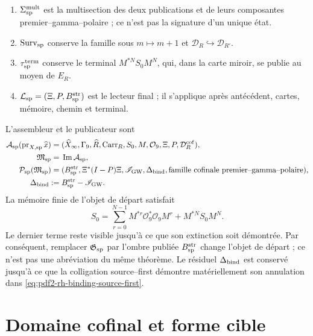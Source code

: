 \begin{enumerate}
 régulateur pour tous les canaux.
 \item \(\Sigma_{\rm sp}^{\rm mult}\) est la multisection des deux
 publications et de leurs composantes premier--gamma--polaire ; ce n'est pas la signature d'un
 unique état.
 \item \(\operatorname{Surv}_{\rm sp}\) conserve la famille sous
 \(m\mapsto m+1\) et \(\mathcal D_R\hookrightarrow\mathcal D_{R'}\).
 \item \(\tau_{\rm sp}^{\rm term}\) conserve le terminal
 \(M^{*N}S_0M^N\), qui, dans la carte miroir, se publie au moyen de \(E_R\).
    \item \(\mathcal L_{\rm sp}=(\Xi,P,B_{\rm sp}^{\rm str})\) est le lecteur final ; il s'applique
 après antécédent, cartes, mémoire, chemin et terminal.
\end{enumerate}

L'assembleur et le publicateur sont
\begin{equation}\label{eq:pdf2-rh-ensamblador-sp}
\begin{aligned}
 \mathcal A_{\rm sp}(\operatorname{pr}_{X,{\rm sp}}\widehat x)
  ={}&(\widehat X_\infty,\Gamma_9,\widehat R,
      \operatorname{Carr}_R,S_0,M,\mathcal O_9,
      \Xi,P,\mathcal D_R^{\rm cof}),\\
 \mathfrak M_{\rm sp}={}&\operatorname{Im}\mathcal A_{\rm sp},\\
 \mathcal P_{\rm sp}(\mathfrak M_{\rm sp})
  ={}&(B_{\rm sp}^{\rm str},\Xi^*(I-P)\Xi,
       \mathscr I_{\rm GW},\Delta_{\rm bind},
       \text{famille cofinale premier--gamma--polaire}),\\
 \Delta_{\rm bind}:={}&B_{\rm sp}^{\rm str}-\mathscr I_{\rm GW}.
\end{aligned}
\end{equation}
La mémoire finie de l'objet de départ satisfait
\begin{equation}\label{eq:pdf2-rh-stein-finito}
 S_0=\sum_{r=0}^{N-1}M^{*r}\mathcal O_9^*\mathcal O_9M^r
     +M^{*N}S_0M^N.
\end{equation}
Le dernier terme reste visible jusqu'à ce que son extinction soit démontrée. Par
conséquent, remplacer \(\mathfrak G_{\rm sp}\) par l'ombre publiée
\(B_{\rm sp}^{\rm str}\) change l'objet de départ ; ce n'est pas une abréviation
du même théorème. Le résiduel \(\Delta_{\rm bind}\) est conservé jusqu'à ce que la
colligation source--first démontre matériellement son annulation dans
\eqref{eq:pdf2-rh-binding-source-first}.

\section{Domaine cofinal et forme cible}

